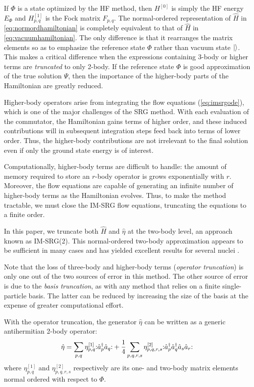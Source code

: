 If $\Phi$ is a state optimized by the HF method, then $H^{[0]}$ is simply the HF energy $E_\Phi$ and $H^{[1]}_{p, q}$ is the Fock matrix $F_{p, q}$.  The normal-ordered representation of $\hat H$ in \eqref{eq:normordhamiltonian} is completely equivalent to that of $\hat H$ in \eqref{eq:vacuumhamiltonian}.  The only difference is that it rearranges the matrix elements so as to emphasize the reference state $\Phi$ rather than vacuum state $|  \rangle$.  This makes a critical difference when the expressions containing 3-body or higher terms are \emph{truncated} to only 2-body.  If the reference state $\Phi$ is good approximation of the true solution $\Psi$, then the importance of the higher-body parts of the Hamiltonian are greatly reduced.

Higher-body operators arise from integrating the flow equations (\ref{eq:imsrgode}), which is one of the major challenges of the SRG method.  With each evaluation of the commutator, the Hamiltonian gains terms of higher order, and these induced contributions will in subsequent integration steps feed back into terms of lower order.  Thus, the higher-body contributions are not irrelevant to the final solution even if only the ground state energy is of interest.

Computationally, higher-body terms are difficult to handle: the amount of memory required to store an $r$-body operator is grows exponentially with $r$.  Moreover, the flow equations are capable of generating an infinite number of higher-body terms as the Hamiltonian evolves.  Thus, to make the method tractable, we must close the IM-SRG flow equations, truncating the equations to a finite order.

In this paper, we truncate both $\hat{H}$ and $\hat{\eta}$ at the two-body level, an approach known as IM-SRG(2).  This normal-ordered two-body approximation appears to be sufficient in many cases and has yielded excellent results for several nuclei \cite{PhysRevLett.106.222502,PhysRevLett.109.052501,IMSRG}.

Note that the loss of three-body and higher-body terms (\textit{operator truncation}) is only one out of the two sources of error in this method.  The other source of error is due to the \textit{basis truncation}, as with any method that relies on a finite single-particle basis.  The latter can be reduced by increasing the size of the basis at the expense of greater computational effort.

With the operator truncation, the generator $\hat{\eta}$ can be written as a generic antihermitian 2-body operator:
\begin{align*}
\hat{\eta} = \sum_{p, q} \eta_{p, q}^{[1]} \mathopen: \hat a_p^\dagger \hat a_q \mathclose: +
\frac{1}{4} \sum_{p, q, r, s}\eta_{p, q, r, s}^{[2]} \mathopen: \hat a_p^\dagger \hat a_q^\dagger \hat a_s \hat a_r \mathclose:
\end{align*}
where $\eta_{p, q}^{[1]}$ and $ \eta_{p, q, r, s}^{[2]}$ respectively are its one- and two-body matrix elements normal ordered with respect to $\Phi$.

